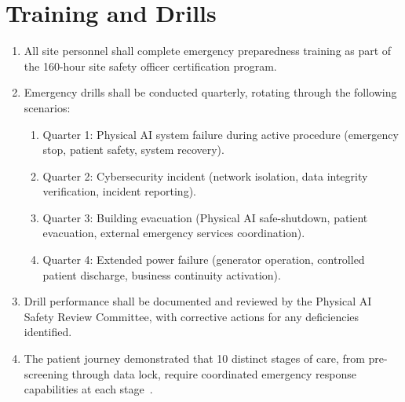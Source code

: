 \section{Training and Drills}

\begin{enumerate}[label=(\alph*)]
\item All site personnel shall complete emergency preparedness training as part
  of the 160-hour site safety officer certification program.

\item Emergency drills shall be conducted quarterly, rotating through the
  following scenarios:
  \begin{enumerate}[label=(\arabic*)]
  \item Quarter 1: Physical AI system failure during active procedure
    (emergency stop, patient safety, system recovery).
  \item Quarter 2: Cybersecurity incident (network isolation, data integrity
    verification, incident reporting).
  \item Quarter 3: Building evacuation (Physical AI safe-shutdown, patient
    evacuation, external emergency services coordination).
  \item Quarter 4: Extended power failure (generator operation, controlled
    patient discharge, business continuity activation).
  \end{enumerate}

\item Drill performance shall be documented and reviewed by the Physical AI
  Safety Review Committee, with corrective actions for any deficiencies
  identified.

\item The patient journey demonstrated that 10 distinct stages of care, from
  pre-screening through data lock, require coordinated emergency response
  capabilities at each stage~\cite{patientjourney2026}.
\end{enumerate}

\printbibliography[title={References}]


